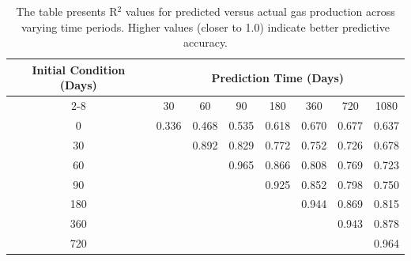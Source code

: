 \begin{table}
    \centering
    \caption{R$^2$ of Predicted vs Actual Gas Production at Different Time Periods}
    \label{tab:r2_gas}
    \begin{tabular}{c|ccccccc}
        \toprule
        \multirow{2}{*}{Initial Condition (Days)} & \multicolumn{7}{c}{Prediction Time (Days)} \\
        \cmidrule{2-8}
        & 30 & 60 & 90 & 180 & 360 & 720 & 1080 \\
        \midrule
        0   & 0.336 & 0.468 & 0.535 & 0.618 & 0.670 & 0.677 & 0.637 \\
        30   &  & 0.892 & 0.829 & 0.772 & 0.752 & 0.726 & 0.678 \\
        60   &  &  & 0.965 & 0.866 & 0.808 & 0.769 & 0.723 \\
        90   &  &  &  & 0.925 & 0.852 & 0.798 & 0.750 \\
        180   &  &  &  &  & 0.944 & 0.869 & 0.815 \\
        360   &  &  &  &  &  & 0.943 & 0.878 \\
        720   &  &  &  &  &  &  & 0.964 \\
        \bottomrule
    \end{tabular}
    \vspace{0.2cm}
    \caption*{The table presents R$^2$ values for predicted versus actual gas production across varying time periods. Higher values (closer to 1.0) indicate better predictive accuracy.}
\end{table}